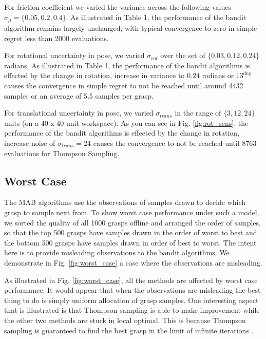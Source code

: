 \documentclass[a4paper, 10pt, conference]{ieeeconf}      %
\begin{document}
For friction coefficient we varied the variance across the following values $\sigma_{\mu} = \lbrace 0.05, 0.2, 0.4 \rbrace$. As illustrated in Table 1, the performance of the bandit algorithm remains largely unchanged, with typical convergence to zero in simple regret less than 2000 evaluations.

For rotational uncertainty in pose, we varied $\sigma_{rot}$ over the set of $\lbrace 0.03, 0.12,0.24\rbrace$ radians. As illustrated in Table 1, the performance of the bandit algorithms is effected by the change in rotation, increase in variance to $0.24$ radians or $13^{\deg}$  causes the convergence in simple regret to not be reached until around 4432 samples or an average of 5.5 samples per grasp. 

For translational uncertainty in pose, we varied $\sigma_{trans}$ in the range of $\lbrace 3,12, 24 \rbrace$ units (on a 40 x 40 unit workspace). As you can see in Fig. \ref{fig:rot_sens}, the performance of the bandit algorithms is effected by the change in rotation, increase noise of $\sigma_{trans} = 24$ causes the convergence to not be reached until 8763 evaluations for Thompson Sampling. 



\subsection{Worst Case}
The MAB algorithms use the observations of samples drawn to decide which grasp to sample next from. To show worst case performance under such a model, we sorted the quality of all 1000 grasps offline and arranged the order of samples, so that the top 500 grasps have samples drawn in the order of worst to best and the bottom 500 grasps have samples drawn in order of best to worst. The intent here is to provide misleading observations to the bandit algorithms. We demonstrate in Fig. \ref{fig:worst_case} a case where the observations are misleading. 

As illustrated in Fig. \ref{fig:worst_case}, all the methods are affected by worst case performance. It would appear that when the observations are misleading the best thing to do is simply uniform allocation of grasp samples. One interesting aspect that is illustrated is that Thompson sampling is able to make improvement while the other two methods are stuck in local optimal. This is because Thompson sampling is guaranteed to find the best grasp in the limit of infinite iterations \cite{agrawal2011analysis}.
\end{document}
